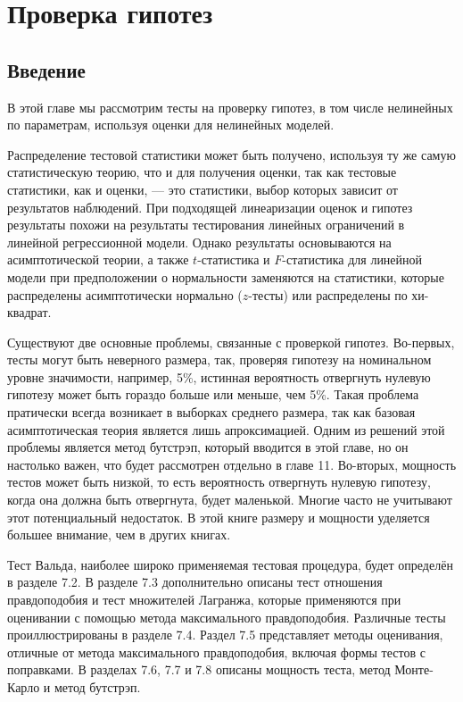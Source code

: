 
\chapter{Проверка гипотез}
\section{Введение}

В этой главе мы рассмотрим тесты на проверку гипотез, в том числе нелинейных по параметрам, используя оценки для нелинейных моделей.

Распределение тестовой статистики может быть получено, используя ту же самую статистическую теорию, что и для получения оценки, так как тестовые статистики, как и оценки, --- это статистики, выбор которых зависит от результатов наблюдений. При подходящей линеаризации оценок и гипотез результаты похожи на результаты тестирования линейных ограничений в линейной регрессионной модели. Однако результаты основываются на асимптотической теории, а также $t$-статистика и $F$-статистика для линейной модели при предположении о нормальности заменяются на статистики, которые распределены асимптотически нормально ($z$-тесты) или распределены по хи-квадрат.

Существуют две основные проблемы, связанные с проверкой гипотез. Во-первых, тесты могут быть неверного размера, так, проверяя гипотезу на номинальном уровне значимости, например, 5\%, истинная вероятность отвергнуть нулевую гипотезу может быть гораздо больше или меньше, чем 5\%. Такая проблема пратически всегда возникает в выборках среднего размера, так как базовая асимптотическая теория является лишь апроксимацией. Одним из решений этой проблемы является метод бутстрэп, который вводится в этой главе, но он настолько важен, что будет рассмотрен отдельно в главе 11. Во-вторых, мощность тестов может быть низкой, то есть вероятность отвергнуть нулевую гипотезу, когда она должна быть отвергнута, будет маленькой. Многие часто не учитывают этот потенциальный недостаток. В этой книге размеру и мощности уделяется большее внимание, чем в других книгах.

Тест Вальда, наиболее широко применяемая тестовая процедура, будет определён в разделе 7.2. В разделе 7.3 дополнительно описаны тест отношения правдоподобия и тест множителей Лагранжа, которые применяются при оценивании с помощью метода максимального правдоподобия. Различные тесты проиллюстрированы в разделе 7.4. Раздел 7.5 представляет методы оценивания, отличные от метода максимального правдоподобия, включая формы тестов с поправками. В разделах 7.6, 7.7 и 7.8 описаны мощность теста, метод Монте-Карло и метод бутстрэп.

